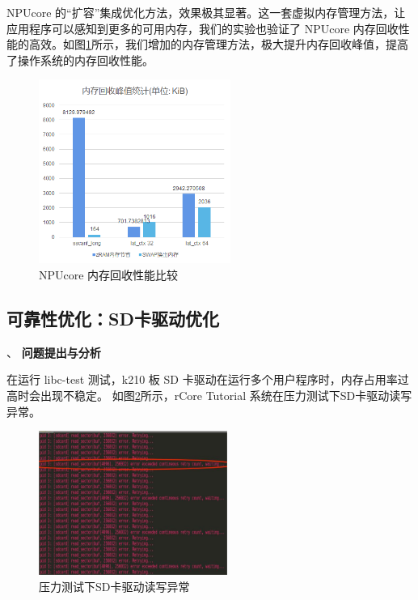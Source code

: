 NPUcore 的“扩容”集成优化方法，效果极其显著。这一套虚拟内存管理方法，让应用程序可以感知到更多的可用内存，我们的实验也验证了 NPUcore 内存回收性能的高效。如图\ref{fig:memory test}所示，我们增加的内存管理方法，极大提升内存回收峰值，提高了操作系统的内存回收性能。

\begin{figure}[h]
	\centering
	\includegraphics[width=0.56\textwidth]{figures/10-04-内存实验评估.jpg}
	\caption{NPUcore 内存回收性能比较}
	\label{fig:memory test}
\end{figure}


\subsection{可靠性优化：SD卡驱动优化}
、
\textbf{问题提出与分析}

在运行 libc-test 测试，k210 板 SD 卡驱动在运行多个用户程序时，内存占用率过高时会出现不稳定。 如图\ref{fig:SD error}所示，rCore Tutorial 系统在压力测试下SD卡驱动读写异常。

\begin{figure}[h]
	\centering
	\includegraphics[width=0.55\textwidth]{figures/10-04-SD卡驱动异常.jpg}
	\caption{压力测试下SD卡驱动读写异常}
	\label{fig:SD error}
\end{figure}

